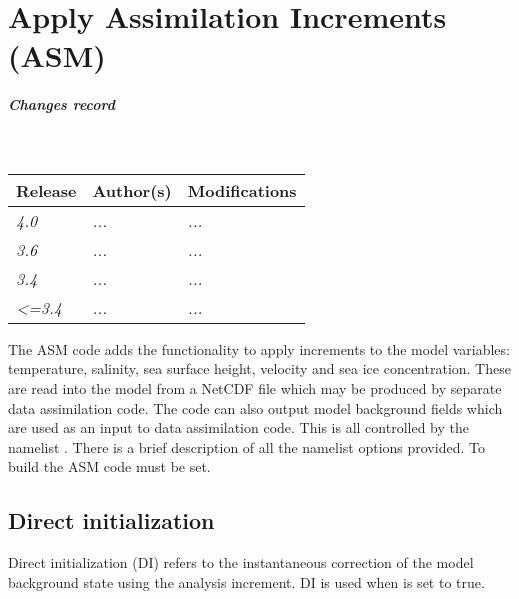 \documentclass[../main/NEMO_manual]{subfiles}
\begin{document}
\chapter{Apply Assimilation Increments (ASM)}
\label{chap:ASM}


\chaptertoc

\paragraph{Changes record} ~\\

{\footnotesize
  \begin{tabularx}{\textwidth}{l||X|X}
    Release & Author(s) & Modifications \\
    \hline
    {\em   4.0} & {\em ...} & {\em ...} \\
    {\em   3.6} & {\em ...} & {\em ...} \\
    {\em   3.4} & {\em ...} & {\em ...} \\
    {\em <=3.4} & {\em ...} & {\em ...}
  \end{tabularx}
}

\clearpage

The ASM code adds the functionality to apply increments to the model variables: temperature, salinity,
sea surface height, velocity and sea ice concentration.
These are read into the model from a NetCDF file which may be produced by separate data assimilation code.
The code can also output model background fields which are used as an input to data assimilation code.
This is all controlled by the namelist .
There is a brief description of all the namelist options provided.
To build the ASM code  must be set.

\section{Direct initialization}
\label{sec:ASM_DI}

Direct initialization (DI) refers to the instantaneous correction of the model background state using
the analysis increment.
DI is used when  is set to true.
\end{document}
